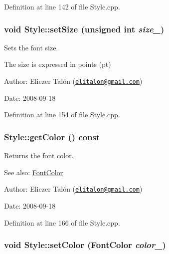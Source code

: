 Definition at line 142 of file Style.cpp.\hypertarget{class_style_b5044902245b464966c13ed6daccb4f3}{
\subsubsection[setSize]{\setlength{\rightskip}{0pt plus 5cm}void Style::setSize (unsigned int {\em size\_\-})}}
\label{class_style_b5044902245b464966c13ed6daccb4f3}


Sets the font size. 

The size is expressed in points (pt)

\begin{Desc}
\item[Author:]Eliezer Talón (\href{mailto:elitalon@gmail.com}{\tt elitalon@gmail.com}) \end{Desc}
\begin{Desc}
\item[Date:]2008-09-18 \end{Desc}


Definition at line 154 of file Style.cpp.\hypertarget{class_style_2ddce056a39c4463bd952d0590b85c6b}{
\subsubsection[getColor]{ Style::getColor () const}}
\label{class_style_2ddce056a39c4463bd952d0590b85c6b}


Returns the font color. 

\begin{Desc}
\item[See also:]\hyperlink{struct_font_color}{FontColor}\end{Desc}
\begin{Desc}
\item[Author:]Eliezer Talón (\href{mailto:elitalon@gmail.com}{\tt elitalon@gmail.com}) \end{Desc}
\begin{Desc}
\item[Date:]2008-09-18 \end{Desc}


Definition at line 166 of file Style.cpp.\hypertarget{class_style_0f9befe0f1b7956339d7068ebc024b9c}{
\subsubsection[setColor]{\setlength{\rightskip}{0pt plus 5cm}void Style::setColor ({\bf FontColor} {\em color\_\-})}}
\label{class_style_0f9befe0f1b7956339d7068ebc024b9c}


